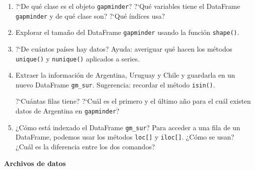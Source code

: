 \documentclass[a4paper,11pt]{article}
\theoremstyle{definition}
\begin{document}
\begin{enumerate}[resume]
    Cargar la biblioteca \lstinline{gapminder} utilizando
\begin{lstlisting}
from gapminder import gapminder
\end{lstlisting}
Si da error es posible que no est\'e instalado. En tal caso ejecuten primero
\begin{lstlisting}
pip install gapminder
\end{lstlisting}
Esto crea un nuevo objeto \lstinline{gapminder}. Pueden ver el contenido con el comando con algunos de estos comandos: \lstinline{display(gapminder)}, \lstinline{gapminder.info()}, \lstinline{gapminder.head()}, \lstinline{gapminder.tail()}.

\item ?`De qué clase es el objeto \lstinline{gapminder}? ?`Qu\'e variables tiene el DataFrame \lstinline{gapminder} y de qu\'e clase son? ?`Qu\'e \'indices usa?

\item Explorar el tama\~no del DataFrame \lstinline{gapminder} usando la función \lstinline{shape()}.

\item ?`De cu\'antos pa\'ises hay datos? Ayuda: averiguar qu\'e hacen los métodos \lstinline{unique()} y \lstinline{nunique()} aplicados a series.



\item Extraer la informaci\'on de Argentina, Uruguay y Chile y guardarla en un nuevo DataFrame \lstinline{gm_sur}. Sugerencia: recordar el método \lstinline{isin()}.

?`Cu\'antas filas tiene? ?`Cu\'al es el primero y el \'ultimo a\~no para el cu\'al existen datos de Argentina en \lstinline{gapminder}?

\item ¿Cómo está indexado el DataFrame \lstinline{gm_sur}? Para acceder a una fila de un DataFrame, podemos usar los métodos \lstinline{loc[]} y \lstinline{iloc[]}. ¿Cómo se usan? ¿Cuál es la diferencia entre los dos comandos?


\end{enumerate}

\textbf{\large Archivos de datos}
\end{document}

